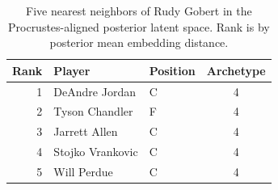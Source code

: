 \begin{table}[htbp]
  \centering\small
  \begin{tabular}{rllc}
    \toprule
    Rank & Player & Position & Archetype \\
    \midrule
    1 & DeAndre Jordan & C & 4 \\
    2 & Tyson Chandler & F & 4 \\
    3 & Jarrett Allen & C & 4 \\
    4 & Stojko Vrankovic & C & 4 \\
    5 & Will Perdue & C & 4 \\
    \bottomrule
  \end{tabular}
  \caption{Five nearest neighbors of Rudy Gobert in the Procrustes-aligned posterior latent space. Rank is by posterior mean embedding distance.}
  \label{tab:Rudy_Gobert_neighbors}
\end{table}

